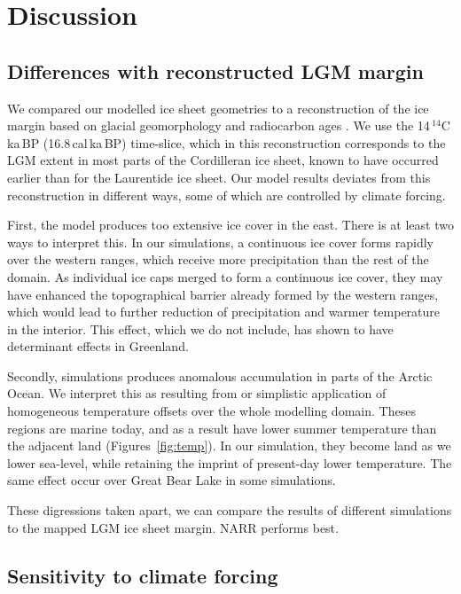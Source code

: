 
\section{Discussion}
\label{sec:discussion}

\subsection{Differences with reconstructed LGM margin}

We compared our modelled ice sheet geometries to a reconstruction of the ice margin based on glacial geomorphology and radiocarbon ages \citep{dyke-2004}. We use the 14\,$^{14}$C\,ka\,BP (16.8\,cal\,ka\,BP) time-slice, which in this reconstruction corresponds to the LGM extent in most parts of the Cordilleran ice sheet, known to have occurred earlier than for the Laurentide ice sheet. Our model results deviates from this reconstruction in different ways, some of which are controlled by climate forcing.

First, the model produces too extensive ice cover in the east. There is at least two ways to interpret this. In our simulations, a continuous ice cover forms rapidly over the western ranges, which receive more precipitation than the rest of the domain. As individual ice caps merged to form a continuous ice cover, they may have enhanced the topographical barrier already formed by the western ranges, which would lead to further reduction of precipitation and warmer temperature in the interior. This effect, which we do not include, has shown to have determinant effects in Greenland.

Secondly, simulations produces anomalous accumulation in parts of the Arctic Ocean. We interpret this as resulting from or simplistic application of homogeneous temperature offsets over the whole modelling domain. Theses regions are marine today, and as a result have lower summer temperature than the adjacent land (Figures~\ref{fig:temp}). In our simulation, they become land as we lower sea-level, while retaining the imprint of present-day lower temperature. The same effect occur over Great Bear Lake in some simulations.

These digressions taken apart, we can compare the results of different simulations to the mapped LGM ice sheet margin. NARR performs best.

\subsection{Sensitivity to climate forcing}

